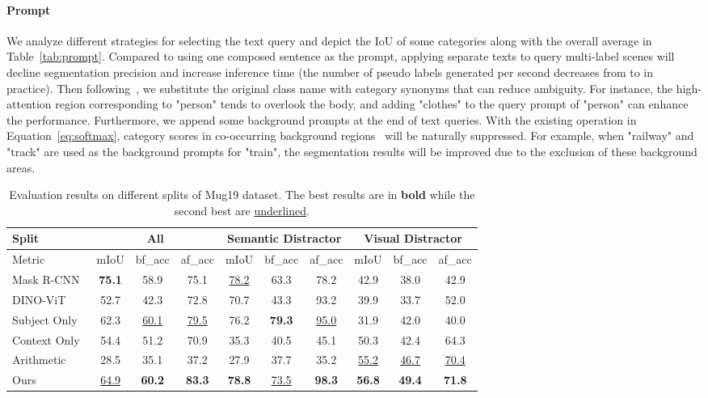 \documentclass[letterpaper]{article} \usepackage[submission]{aaai24}  \usepackage{times}  \usepackage{helvet}  \usepackage{courier}  \usepackage[hyphens]{url}  \usepackage{graphicx} \urlstyle{rm} \def\UrlFont{\rm}  \usepackage{natbib}  \usepackage{caption} \frenchspacing  \setlength{\pdfpagewidth}{8.5in} \setlength{\pdfpageheight}{11in} \usepackage{algorithm}
\begin{document}
\paragraph{Prompt}
We analyze different strategies for selecting the text query and depict the IoU of some categories along with the overall average in Table~\ref{tab:prompt}.
Compared to using one composed sentence as the prompt, applying separate texts to query multi-label scenes will decline segmentation precision and increase inference time (the number of pseudo labels generated per second decreases from  to  in practice).
Then following~\cite{CLIP-ES}, we substitute the original class name with category synonyms that can reduce ambiguity.
For instance, the high-attention region corresponding to "person" tends to overlook the body, and adding "clothes" to the query prompt of "person" can enhance the performance.
Furthermore, we append some background prompts at the end of text queries.
With the existing  operation in Equation~\ref{eq:softmax}, category scores in co-occurring background regions~\cite{clims} will be naturally suppressed.
For example, when "railway" and "track" are used as the background prompts for "train", the segmentation results will be improved due to the exclusion of these background areas.
\begin{table*}
  \centering
  \begin{tabular}{l|ccc|ccc|ccc}
    \hline
    Split  & \multicolumn{3}{c|}{All} & \multicolumn{3}{c|}{Semantic Distractor} & \multicolumn{3}{c}{Visual Distractor} \\
    \hline
    Metric  & mIoU & bf\_acc & af\_acc & mIoU & bf\_acc & af\_acc & mIoU & bf\_acc & af\_acc  \\
    \hline
    Mask R-CNN~\cite{maskrcnn}       & \textbf{75.1} & 58.9 & 75.1 & \underline{78.2} & 63.3 & 78.2 & 42.9 & 38.0 & 42.9 \\
    DINO-ViT~\cite{dino}       & 52.7 & 42.3 & 72.8 & 70.7 & 43.3 & 93.2 & 39.9 & 33.7 & 52.0 \\
    Subject Only       & 62.3 & \underline{60.1} & \underline{79.5} & 76.2 & \textbf{79.3} & \underline{95.0} & 31.9 & 42.0 & 40.0 \\
Context Only      & 54.4 & 51.2 & 70.9 & 35.3 & 40.5 & 45.1 & 50.3 & 42.4 & 64.3 \\
    Arithmetic & 28.5 & 35.1 & 37.2 & 27.9 & 37.7 & 35.2 & \underline{55.2} & \underline{46.7} & \underline{70.4} \\
    Ours & \underline{64.9} & \textbf{60.2} & \textbf{83.3} & \textbf{78.8} & \underline{73.5} & \textbf{98.3} & \textbf{56.8} & \textbf{49.4} & \textbf{71.8} \\
    \hline
  \end{tabular}
  \caption{Evaluation results on different splits of Mug19 dataset. The best results are in \textbf{bold} while the second best are \underline{underlined}.}
  \label{tab:personalized}
\end{table*}
\end{document}
